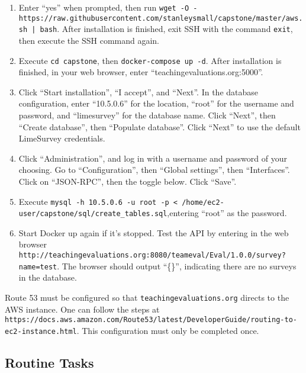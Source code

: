 \documentclass{article}
\begin{document}
\begin{enumerate}
    \item Enter ``yes'' when prompted, then run \verb+wget -O - https://raw.githubusercontent.com+\newline\verb+/stanleysmall/capstone/master/aws.sh | bash+. After installation is finished, exit SSH with the command \verb|exit|, then execute the SSH command again.

    \item Execute \verb|cd capstone|, then \verb|docker-compose up -d|. After installation is finished, in your web \newline browser, enter ``teachingevaluations.org:5000''.

    \item Click ``Start installation'', ``I accept'', and ``Next''. In the database configuration, enter ``10.5.0.6'' for the location, ``root'' for the username and password, and ``limesurvey'' for the database name. Click ``Next'', then ``Create database'', then ``Populate database''. Click ``Next'' to use the default LimeSurvey credentials.

    \item Click ``Administration'', and log in with a username and password of your choosing. Go to ``Configuration'', then ``Global settings'', then ``Interfaces''. Click on ``JSON-RPC'', then the toggle below. Click ``Save''.

    \item Execute \verb|mysql -h 10.5.0.6 -u root -p < /home/ec2-user/capstone/sql/create_tables.sql|,\newline entering ``root'' as the password.

    \item Start Docker up again if it's stopped. Test the API by entering in the web browser \newline \verb|http://teachingevaluations.org:8080/teameval/Eval/1.0.0/survey?name=test|. The browser should output ``\{\}'', indicating there are no surveys in the database.
\end{enumerate}

\vspace{4mm}

Route 53 must be configured so that \verb|teachingevaluations.org| directs to the AWS instance. One can follow the steps at \newline \verb|https://docs.aws.amazon.com/Route53/latest/DeveloperGuide/routing-to-ec2-instance.html|. This configuration must only be completed once. 

\subsection{Routine Tasks}
\end{document}
